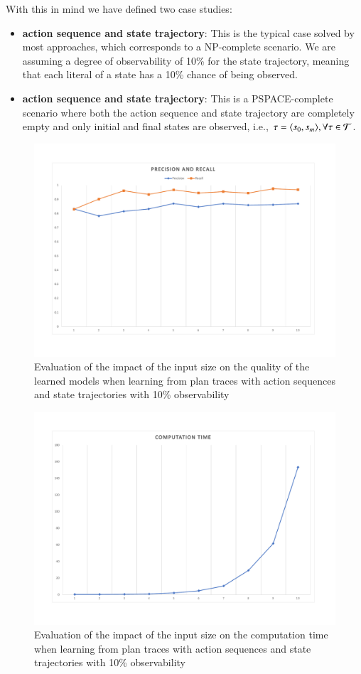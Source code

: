 With this in mind we have defined two case studies:
\begin{itemize}
	\item \textbf{\FO action sequence and \PO state trajectory}: This is the typical case solved by most approaches, which corresponds to a NP-complete scenario. We are assuming a degree of observability of 10\% for the state trajectory, meaning that each literal of a state has a 10\% chance of being observed.
	\item  \textbf{\NO action sequence and \NO state trajectory}: This is a PSPACE-complete scenario where both the action sequence and state trajectory are completely empty and only initial and final states are observed, i.e., $\tau = {\langle s_0, s_m \rangle}, \forall \tau \in \mathcal{T}$.
\end{itemize}

\begin{figure}[hbt!]
	\centering
	\includegraphics[width=0.8\linewidth]{figures/input_size_100_10_precision.pdf}
	\caption{Evaluation of the impact of the input size on the quality of the learned models when learning from plan traces with \FO action sequences and \PO state trajectories with 10\% observability}
	\label{fig:np_quality}
\end{figure}

\begin{figure}[hbt!]
	\centering
	\includegraphics[width=0.8\linewidth]{figures/input_size_100_10_time.pdf}
	\caption{Evaluation of the impact of the input size on the computation time when learning from plan traces with \FO action sequences and \PO state trajectories with 10\% observability}
	\label{fig:np_time}
\end{figure}

